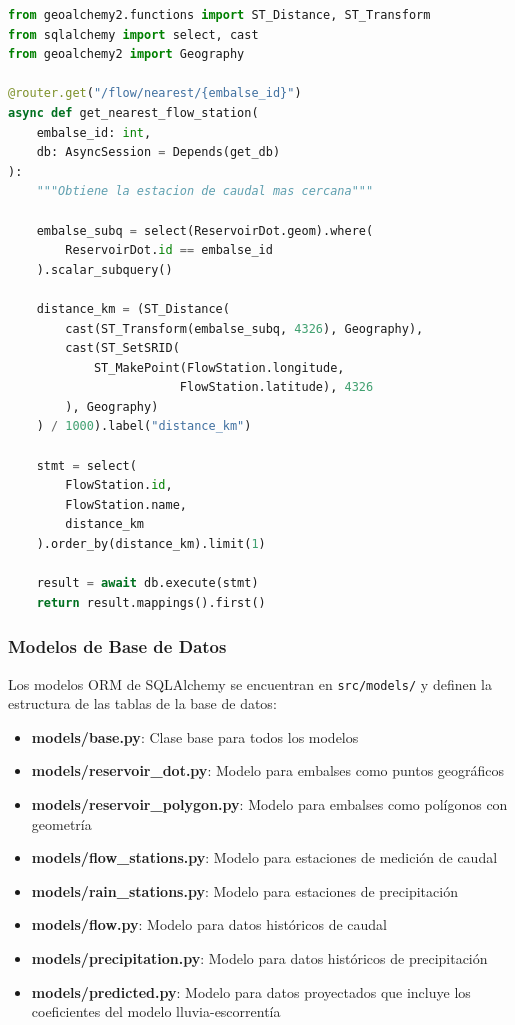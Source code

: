 \begin{lstlisting}[language=python]
from geoalchemy2.functions import ST_Distance, ST_Transform
from sqlalchemy import select, cast
from geoalchemy2 import Geography

@router.get("/flow/nearest/{embalse_id}")
async def get_nearest_flow_station(
    embalse_id: int,
    db: AsyncSession = Depends(get_db)
):
    """Obtiene la estacion de caudal mas cercana"""
    
    embalse_subq = select(ReservoirDot.geom).where(
        ReservoirDot.id == embalse_id
    ).scalar_subquery()
    
    distance_km = (ST_Distance(
        cast(ST_Transform(embalse_subq, 4326), Geography),
        cast(ST_SetSRID(
            ST_MakePoint(FlowStation.longitude, 
                        FlowStation.latitude), 4326
        ), Geography)
    ) / 1000).label("distance_km")
    
    stmt = select(
        FlowStation.id,
        FlowStation.name,
        distance_km
    ).order_by(distance_km).limit(1)
    
    result = await db.execute(stmt)
    return result.mappings().first()
\end{lstlisting}

\subsubsection{Modelos de Base de Datos}

Los modelos ORM de SQLAlchemy se encuentran en \texttt{src/models/} y definen la estructura de las tablas de la base de datos:

\begin{itemize}
    \item \textbf{models/base.py}: Clase base para todos los modelos
    \item \textbf{models/reservoir\_dot.py}: Modelo para embalses como puntos geográficos
    \item \textbf{models/reservoir\_polygon.py}: Modelo para embalses como polígonos con geometría
    \item \textbf{models/flow\_stations.py}: Modelo para estaciones de medición de caudal
    \item \textbf{models/rain\_stations.py}: Modelo para estaciones de precipitación
    \item \textbf{models/flow.py}: Modelo para datos históricos de caudal
    \item \textbf{models/precipitation.py}: Modelo para datos históricos de precipitación
    \item \textbf{models/predicted.py}: Modelo para datos proyectados que incluye los coeficientes del modelo lluvia-escorrentía
\end{itemize}

